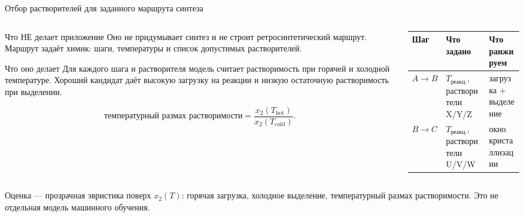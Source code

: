 \documentclass[aspectratio=169,10pt]{beamer}
\begin{document}
\begin{frame}{Отбор растворителей для заданного маршрута синтеза}
  \small
  \begin{columns}[T,onlytextwidth]
    \begin{column}{0.52\textwidth}
      \begin{block}{Что НЕ делает приложение}
        \scriptsize
        Оно не придумывает синтез и не строит ретросинтетический маршрут. Маршрут задаёт химик: шаги, температуры и список допустимых растворителей.
      \end{block}
      \begin{block}{Что оно делает}
        \scriptsize
        Для каждого шага и растворителя модель считает растворимость при горячей и холодной температуре. Хороший кандидат даёт высокую загрузку на реакции и низкую остаточную растворимость при выделении.
      \end{block}
      \[
        \text{температурный размах растворимости}
        =
        \frac{x_2(T_{\mathrm{hot}})}{x_2(T_{\mathrm{cold}})}.
      \]
    \end{column}
    \begin{column}{0.44\textwidth}
      \begin{tabularx}{\textwidth}{lYY}
        \toprule
        \textbf{Шаг} & \textbf{Что задано} & \textbf{Что ранжируем}\\
        \midrule
        $A\to B$ & $T_{\text{реакц.}}$, растворители X/Y/Z & загрузка + выделение\\
        $B\to C$ & $T_{\text{реакц.}}$, растворители U/V/W & окно кристаллизации\\
        \bottomrule
      \end{tabularx}
    \end{column}
  \end{columns}
  \par\vspace{0.45em}
  \begin{minipage}{0.94\textwidth}
    \scriptsize\color{TGSlate}
    Оценка — прозрачная эвристика поверх $x_2(T)$: горячая загрузка, холодное выделение, температурный размах растворимости. Это не отдельная модель машинного обучения.
  \end{minipage}
\end{frame}
\end{document}
